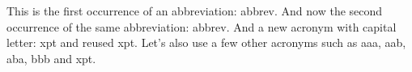 




This is the first occurrence of an abbreviation: \gls{abbrev}. And now the second occurrence of the same abbreviation: \gls{abbrev}. And a new acronym with capital letter: \Gls{xpt} and reused \gls{xpt}.  Let's also use a few other acronyms such as \gls{aaa}, \gls{aab}, \gls{aba}, \gls{bbb} and \gls{xpt}.










